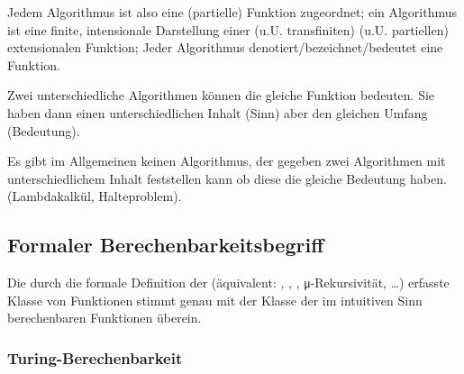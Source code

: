 \documentclass{scrartcl}
\begin{document}
\begin{enumerate*}
\begin{remark}
Jedem Algorithmus ist also eine (partielle) Funktion zugeordnet;
ein Algorithmus ist eine finite, intensionale Darstellung einer 
(u.U. transfiniten) (u.U. partiellen) extensionalen Funktion;
Jeder Algorithmus denotiert/bezeichnet/bedeutet eine Funktion.
\end{remark}

\begin{remark}
Zwei unterschiedliche Algorithmen können die gleiche Funktion bedeuten.
Sie haben dann einen unterschiedlichen Inhalt (Sinn) aber den gleichen
Umfang (Bedeutung).

Es gibt im Allgemeinen keinen Algorithmus, der gegeben zwei Algorithmen mit 
unterschiedlichem Inhalt feststellen kann ob diese die gleiche Bedeutung haben.
(Lambdakalkül, Halteproblem).
\end{remark}

% 


\subsection{Formaler Berechenbarkeitsbegriff}

\begin{theorem}
Die durch die formale Definition der 
(äquivalent: , ,
, μ-Rekursivität, \dots) erfasste Klasse von
Funktionen stimmt genau mit der Klasse der im intuitiven Sinn berechenbaren
Funktionen überein.
\end{theorem}

\subsubsection{Turing-Berechenbarkeit}


\end{enumerate*}
\end{document}
